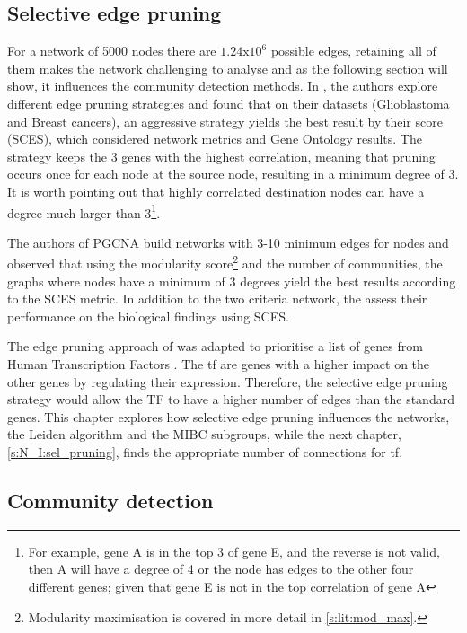 \subsection{Selective edge pruning} \label{s:N_I:methods_edge_pruning}

For a network of 5000 nodes there are $1.24\text{x}10^6$ possible edges, retaining all of them makes the network challenging to analyse and as the following section will show, it influences the community detection methods. In \citet{Care2019-ij}, the authors explore different edge pruning strategies and found that on their datasets (Glioblastoma and Breast cancers), an aggressive strategy yields the best result by their score (SCES), which considered network metrics and Gene Ontology results. The strategy keeps the 3 genes with the highest correlation, meaning that pruning occurs once for each node at the source node, resulting in a minimum degree of 3. It is worth pointing out that highly correlated destination nodes can have a degree much larger than 3\footnote{For example, gene A is in the top 3 of gene E, and the reverse is not valid, then A will have a degree of 4 or the node has edges to the other four different genes; given that gene E is not in the top correlation of gene A}. 

The authors of PGCNA build networks with 3-10 minimum edges for nodes and observed that using the modularity score\footnote{Modularity maximisation is covered in more detail in \cref{s:lit:mod_max}.} and the number of communities, the graphs where nodes have a minimum of 3 degrees yield the best results according to the SCES metric. In addition to the two criteria network, the \citet{Care2019-ij} assess their performance on the biological findings using SCES.

The edge pruning approach of \citet{Care2019-ij} was adapted to prioritise a list of genes from Human Transcription Factors \citep{Lambert2018-el}. The \acrlong{tf} are genes with a higher impact on the other genes by regulating their expression. Therefore, the selective edge pruning strategy would allow the TF to have a higher number of edges than the standard genes. This chapter explores how selective edge pruning influences the networks, the Leiden algorithm and the MIBC subgroups, while the next chapter, \cref{s:N_I:sel_pruning}, finds the appropriate number of connections for \acrshort{tf}.

\subsection{Community detection} \label{s:N_I:methods_comm_detection}


